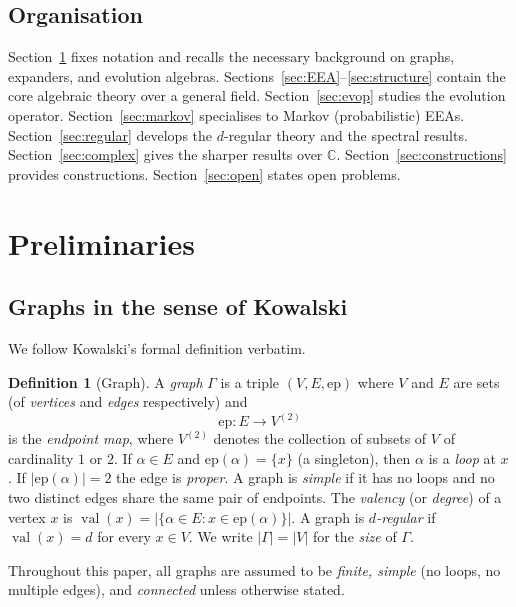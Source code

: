 \documentclass[12pt,a4paper]{amsart}
\theoremstyle{definition}
\newtheorem{definition}[theorem]{Definition}
\DeclareMathOperator{\val}{val}
\newcommand{\C}{\mathbb{C}}
\begin{document}
\subsection*{Organisation}
Section~\ref{sec:prelim} fixes notation and recalls the necessary
background on graphs, expanders, and evolution algebras.
Sections~\ref{sec:EEA}--\ref{sec:structure} contain the core algebraic
theory over a general field.  Section~\ref{sec:evop} studies the
evolution operator.  Section~\ref{sec:markov} specialises to Markov
(probabilistic) EEAs.  Section~\ref{sec:regular} develops the
$d$-regular theory and the spectral results.  Section~\ref{sec:complex}
gives the sharper results over $\C$.  Section~\ref{sec:constructions}
provides constructions.  Section~\ref{sec:open} states open problems.

\section{Preliminaries}\label{sec:prelim}

\subsection{Graphs in the sense of Kowalski}

We follow Kowalski's formal definition \cite[Definition~2.1.1]{Kowalski2019}
verbatim.

\begin{definition}[Graph]\label{def:graph}
A \emph{graph} $\varGamma$ is a triple $(V,E,\mathrm{ep})$ where $V$
and $E$ are sets (of \emph{vertices} and \emph{edges} respectively) and
\[
  \mathrm{ep}: E \longrightarrow V^{(2)}
\]
is the \emph{endpoint map}, where $V^{(2)}$ denotes the collection of
subsets of $V$ of cardinality $1$ or $2$.  If $\alpha\in E$ and
$\mathrm{ep}(\alpha)=\{x\}$ (a singleton), then $\alpha$ is a
\emph{loop} at $x$.  If $|\mathrm{ep}(\alpha)|=2$ the edge is
\emph{proper}.  A graph is \emph{simple} if it has no loops and no two
distinct edges share the same pair of endpoints.  The \emph{valency} (or
\emph{degree}) of a vertex $x$ is $\val(x)=|\{\alpha\in E : x\in
\mathrm{ep}(\alpha)\}|$.  A graph is \emph{$d$-regular} if $\val(x)=d$
for every $x\in V$.  We write $|\varGamma|=|V|$ for the \emph{size} of
$\varGamma$.
\end{definition}

Throughout this paper, all graphs are assumed to be \emph{finite,
simple} (no loops, no multiple edges), and \emph{connected} unless
otherwise stated.
\end{document}
